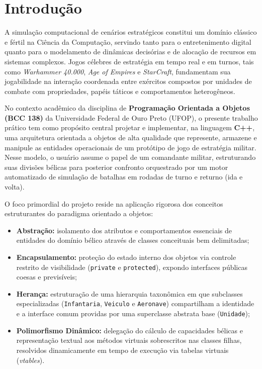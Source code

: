 \documentclass[12pt,a4paper]{article}
\begin{document}
\section{Introdução}
\label{sec:introducao}

A simulação computacional de cenários estratégicos constitui um domínio clássico e fértil na Ciência da Computação, servindo tanto para o entretenimento digital quanto para o modelamento de dinâmicas decisórias e de alocação de recursos em sistemas complexos. Jogos célebres de estratégia em tempo real e em turnos, tais como \textit{Warhammer 40.000}, \textit{Age of Empires} e \textit{StarCraft}, fundamentam sua jogabilidade na interação coordenada entre exércitos compostos por unidades de combate com propriedades, papéis táticos e comportamentos heterogêneos.

No contexto acadêmico da disciplina de \textbf{Programação Orientada a Objetos (BCC 138)} da Universidade Federal de Ouro Preto (UFOP), o presente trabalho prático tem como propósito central projetar e implementar, na linguagem \textbf{C++}, uma arquitetura orientada a objetos de alta qualidade que represente, armazene e manipule as entidades operacionais de um protótipo de jogo de estratégia militar. Nesse modelo, o usuário assume o papel de um comandante militar, estruturando suas divisões bélicas para posterior confronto orquestrado por um motor automatizado de simulação de batalhas em rodadas de turno e returno (ida e volta).

O foco primordial do projeto reside na aplicação rigorosa dos conceitos estruturantes do paradigma orientado a objetos:
\begin{itemize}
    \item \textbf{Abstração:} isolamento dos atributos e comportamentos essenciais de entidades do domínio bélico através de classes conceituais bem delimitadas;
    \item \textbf{Encapsulamento:} proteção do estado interno dos objetos via controle restrito de visibilidade (\texttt{private} e \texttt{protected}), expondo interfaces públicas coesas e previsíveis;
    \item \textbf{Herança:} estruturação de uma hierarquia taxonômica em que subclasses especializadas (\texttt{Infantaria}, \texttt{Veiculo} e \texttt{Aeronave}) compartilham a identidade e a interface comum providas por uma superclasse abstrata base (\texttt{Unidade});
    \item \textbf{Polimorfismo Dinâmico:} delegação do cálculo de capacidades bélicas e representação textual aos métodos virtuais sobrescritos nas classes filhas, resolvidos dinamicamente em tempo de execução via tabelas virtuais (\textit{vtables}).
\end{itemize}
\end{document}
